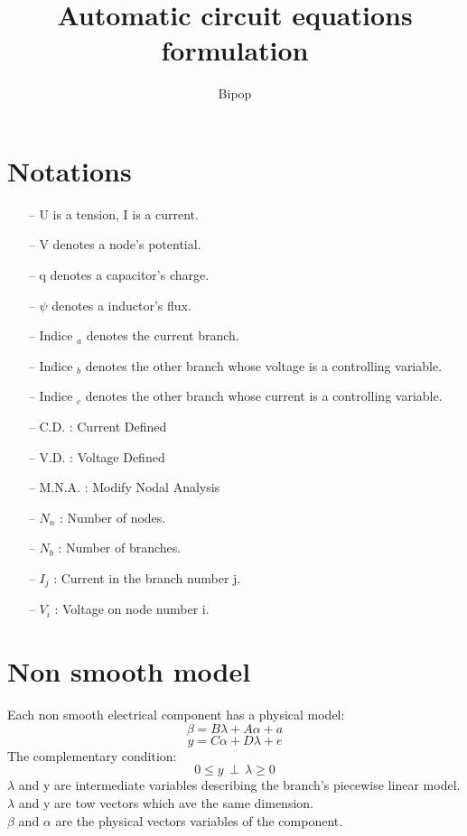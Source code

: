 \documentclass[10pt]{article}
\begin{document}
 \title{Automatic circuit equations formulation}
\author{Bipop}
\maketitle

\newpage
\tableofcontents
 \newpage
 \section{Notations}
\begin{itemize}
  \item[--] U is a tension, I is a current.
  \item[--] V denotes a node's potential.
  \item[--] q denotes a capacitor's charge.
  \item[--] $\psi$ denotes a inductor's flux.
  \item[--] Indice $_{a}$ denotes the current branch.
  \item[--] Indice $_{b}$ denotes the other branch whose voltage is a controlling variable.
  \item[--] Indice $_{c}$ denotes the other branch whose current is a controlling variable.
\item[--] C.D. : Current Defined
\item[--] V.D. : Voltage Defined
\item[--] M.N.A. : Modify Nodal Analysis
\end{itemize}
 \begin{itemize}
\item[--] $N_{n}$ : Number of nodes.
\item[--] $N_{b}$ : Number of branches.
\item[--] $I_{j}$ : Current in the branch number j.
\item[--] $V_{i}$ : Voltage on node number i. 
\end{itemize}

 \section{Non smooth model}
Each non smooth electrical component has a physical model:
\[\beta=B\lambda + A\alpha +a\]
\[y=C\alpha + D\lambda +e\]
The complementary condition:
\[0 \leq y \, \perp \, \lambda \geq 0\]
$\lambda$ and y are intermediate variables describing the branch's piecewise linear model.
$\lambda$ and y are tow vectors which ave the same dimension.\\
\newline
$\beta$ and $\alpha$ are the physical vectors variables of the component.\\

\end{document}
